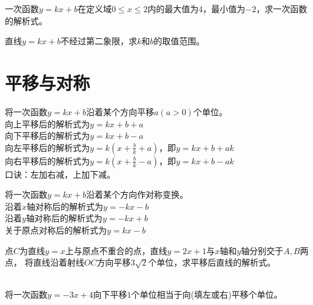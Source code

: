\begin{problem}
一次函数$y=kx+b$在定义域$0\le x \le 2$内的最大值为$4$，最小值为$−2$，求一次函数的解析式。
\end{problem}
\begin{problem}
直线$y=kx+b$不经过第二象限，求$k$和$b$的取值范围。
\end{problem}
\clearpage
\section{平移与对称}
\begin{theorem}
    将一次函数$y=kx+b$沿着某个方向平移$a(a>0)$个单位。 \\
    向上平移后的解析式为$y=kx+b+a$ \\
    向下平移后的解析式为$y=kx+b-a$ \\
    向左平移后的解析式为$y=k(x+\frac{b}{k}+a)$，即$y=kx+b+ak$ \\
    向右平移后的解析式为$y=k(x+\frac{b}{k}-a)$，即$y=kx+b-ak$ \\
    口诀：左加右减，上加下减。
\end{theorem}
\begin{theorem}
    将一次函数$y=kx+b$沿着某个方向作对称变换。\\
    沿着$x$轴对称后的解析式为$y=-kx-b$ \\
    沿着$y$轴对称后的解析式为$y=-kx+b$ \\
    关于原点对称后的解析式为$y=kx-b$
\end{theorem}
\begin{problem}
点$C$为直线$y=x$上与原点不重合的点，直线$y=2x+1$与$x$轴和$y$轴分别交于$A,B$两点，
将直线沿着射线$OC$方向平移$3\sqrt2$个单位，求平移后直线的解析式。\\
\\
\end{problem}
\begin{problem}
将一次函数$y=-3x+4$向下平移$1$个单位相当于向\underline{\quad}(填左或右)平移\underline{\quad}个单位。
\end{problem}
\clearpage

